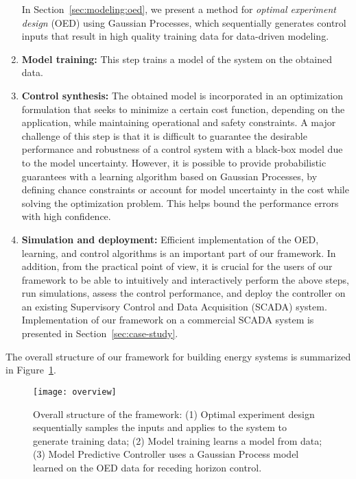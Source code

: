 \begin{enumerate}
  In Section~\ref{sec:modeling:oed}, we present a method for \emph{optimal experiment design} (OED) using Gaussian Processes, which sequentially generates control inputs that result in high quality training data for data-driven modeling.
\item \textbf{Model training:} This step trains a model of the system on the obtained data.
\item \textbf{Control synthesis:} The obtained model is incorporated in an optimization formulation that seeks to minimize a certain cost function, depending on the application, while maintaining operational and safety constraints.
  A major challenge of this step is that it is difficult to guarantee the desirable performance and robustness of a control system with a black-box model due to the model uncertainty.  
  However, it is possible to provide probabilistic guarantees with a learning algorithm based on Gaussian Processes, by defining chance constraints or account for model uncertainty in the cost while solving the optimization problem.
  This helps bound the performance errors with high confidence. 
\item \textbf{Simulation and deployment:} Efficient implementation of the OED, learning, and control algorithms is an important part of our framework.  In addition, from the practical point of view, it is crucial for the users of our framework to be able to intuitively and interactively perform the above steps, run simulations, assess the control performance, and deploy the controller on an existing Supervisory Control and Data Acquisition (SCADA) system.  Implementation of our framework on a commercial SCADA system is presented in Section~\ref{sec:case-study}.
\end{enumerate}

The overall structure of our framework for building energy systems is summarized in Figure~\ref{fig:overview}.

\begin{figure}[!t]
	\centering
	\texttt{[image: overview]}
	\caption{Overall structure of the framework: (1) Optimal experiment design sequentially samples the inputs and applies to the system to generate training data; (2) Model training learns a model from data; (3) Model Predictive Controller uses a Gaussian Process model learned on the OED data for receding horizon control.}
	\label{fig:overview}
\end{figure}


